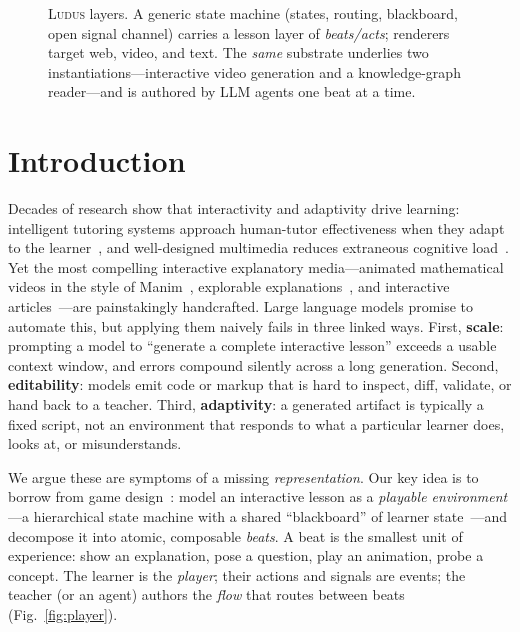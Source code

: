 \documentclass[sigconf,review,anonymous]{acmart}
\newcommand{\sys}{\textsc{Ludus}\xspace}
\begin{document}
\begin{figure}[t]
  \centering
  \resizebox{\columnwidth}{!}{}
  \caption{\sys{} layers. A generic state machine (states, routing, blackboard,
  open signal channel) carries a lesson layer of \emph{beats/acts}; renderers
  target web, video, and text. The \emph{same} substrate underlies two
  instantiations---interactive video generation and a knowledge-graph
  reader---and is authored by LLM agents one beat at a time.}
  \label{fig:arch}
\end{figure}

\section{Introduction}

Decades of research show that interactivity and adaptivity drive learning:
intelligent tutoring systems approach human-tutor effectiveness when they adapt
to the learner~\cite{vanlehn2011relative,anderson1995cognitive}, and
well-designed multimedia reduces extraneous cognitive
load~\cite{mayer2002multimedia,sweller1988cognitive}. Yet the most compelling
interactive explanatory media---animated mathematical videos in the style of
Manim~\cite{manim}, explorable explanations~\cite{victor2011explorable}, and
interactive articles~\cite{hohman2020scrolly}---are painstakingly handcrafted.
Large language models promise to automate this, but applying them naively fails
in three linked ways. First, \textbf{scale}: prompting a model to ``generate a
complete interactive lesson'' exceeds a usable context window, and errors
compound silently across a long generation. Second, \textbf{editability}:
models emit code or markup that is hard to inspect, diff, validate, or hand back
to a teacher. Third, \textbf{adaptivity}: a generated artifact is typically a
fixed script, not an environment that responds to what a particular learner
does, looks at, or misunderstands.

We argue these are symptoms of a missing \emph{representation}. Our key idea is
to borrow from game design~\cite{millington2019ai}: model an interactive lesson
as a \emph{playable environment}---a hierarchical state machine with a shared
``blackboard'' of learner state~\cite{harel1987statecharts}---and decompose it
into atomic, composable \emph{beats}. A beat is the smallest unit of
experience: show an explanation, pose a question, play an animation, probe a
concept. The learner is the \emph{player}; their actions and signals are events;
the teacher (or an agent) authors the \emph{flow} that routes between beats
(Fig.~\ref{fig:player}).
\end{document}

